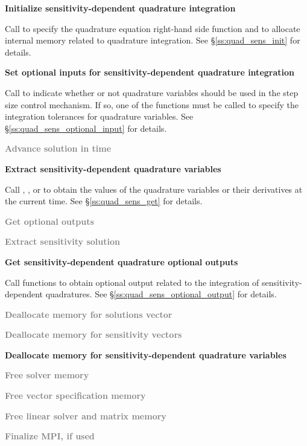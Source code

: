 \begin{Steps}
\item\label{i:quad_sens_init}
  {\bf Initialize sensitivity-dependent quadrature integration}

  Call  to specify the quadrature equation right-hand
  side function and to allocate internal memory related to quadrature integration. 
  See \S\ref{ss:quad_sens_init} for details.

\item\label{i:quad_sens_optional_input}
  {\bf Set optional inputs for sensitivity-dependent quadrature integration}

  Call  to indicate whether or not quadrature variables
  should be used in the step size control mechanism. If so, one of the 
   functions  must be called to specify the integration 
  tolerances for quadrature variables.
  See \S\ref{ss:quad_sens_optional_input} for details.

\item\label{i:quad_sens_ida_solve}
  \textcolor{gray}{\bf Advance solution in time}

\item
  {\bf Extract sensitivity-dependent quadrature variables}

  Call , ,  or 
   to obtain the values of the quadrature variables or their 
  derivatives at the current time. See \S\ref{ss:quad_sens_get} for details.

\item
  \textcolor{gray}{\bf Get optional outputs}

\item
  \textcolor{gray}{\bf Extract sensitivity solution}

\item
  {\bf Get sensitivity-dependent quadrature optional outputs}

  Call  functions to obtain optional output related to
  the integration of sensitivity-dependent quadratures.
  See \S\ref{ss:quad_sens_optional_output} for details.

\item
  \textcolor{gray}{\bf Deallocate memory for solutions vector}

\item 
  \textcolor{gray}{\bf Deallocate memory for sensitivity vectors}

\item
  {\bf Deallocate memory for sensitivity-dependent quadrature variables}
  
\item
  \textcolor{gray}{\bf Free solver memory}

\item
  \textcolor{gray}{\bf Free vector specification memory}

\item
  \textcolor{gray}{\bf Free linear solver and matrix memory}
  
\item 
  \textcolor{gray}{\bf Finalize MPI, if used}
  
\end{Steps}
